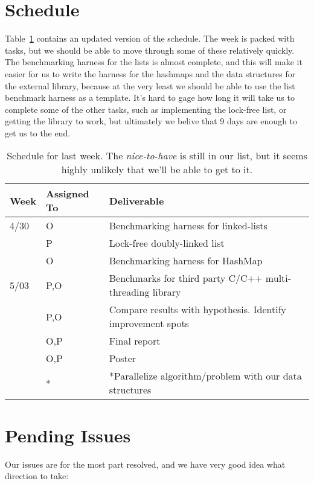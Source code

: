 \documentclass[11pt]{article}
\begin{document}
\section*{Schedule}
Table~\ref{table:sche} contains an updated version of the schedule. The week is
packed with tasks, but we should be able to move through some of these
relatively quickly. The benchmarking harness for the lists is almost complete,
and this will make it easier for us to write the harness for the hashmaps and
the data structures for the external library, because at the very least we
should be able to use the list benchmark harness as a template. It's hard to
gage how long it will take us to complete some of the other tasks, such as
implementing the lock-free list, or getting the library to work, but ultimately
we belive that 9 days are enough to get us to the end.

\begin{table}[t]
\begin{center}
\begin{tabular}{lll}
\toprule
\bf Week & \bf Assigned To  & \bf Deliverable   \\
\midrule
4/30     & O     & Benchmarking harness for linked-lists \\
         & P     & Lock-free doubly-linked list \\
         & O     & Benchmarking harness for HashMap \\
5/03     & P,O   & Benchmarks for third party C/C++ multi-threading library \\
         & P,O   & Compare results with hypothesis. Identify improvement spots \\
         & O,P   & Final report \\
         & O,P   & Poster \\
         & *     & *Parallelize algorithm/problem with our data structures \\
\bottomrule
\end{tabular}
\caption{
Schedule for last week. The {\it nice-to-have} is still in our list, but it
seems highly unlikely that we'll be able to get to it.
}
\label{table:sche}
\end{center}
\end{table}

\section*{Pending Issues}
Our issues are for the most part resolved, and we have very good idea what
direction to take:
\end{document}
